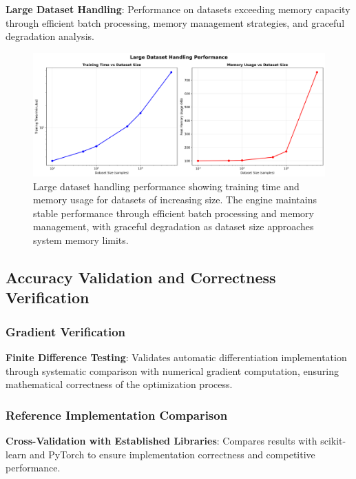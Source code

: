 \documentclass[11pt,a4paper]{report}
\begin{document}
\textbf{Large Dataset Handling}: Performance on datasets exceeding memory capacity through efficient batch processing, memory management strategies, and graceful degradation analysis.

\begin{figure}[H]
\centering
\includegraphics[width=\textwidth]{performance_large_dataset_handling.png}
\caption{Large dataset handling performance showing training time and memory usage for datasets of increasing size. The engine maintains stable performance through efficient batch processing and memory management, with graceful degradation as dataset size approaches system memory limits.}
\label{fig:large_dataset_performance}
\end{figure}

\subsection{Accuracy Validation and Correctness Verification}

\subsubsection{Gradient Verification}

\textbf{Finite Difference Testing}: Validates automatic differentiation implementation through systematic comparison with numerical gradient computation, ensuring mathematical correctness of the optimization process.

\subsubsection{Reference Implementation Comparison}

\textbf{Cross-Validation with Established Libraries}: Compares results with scikit-learn and PyTorch to ensure implementation correctness and competitive performance.
\end{document}
